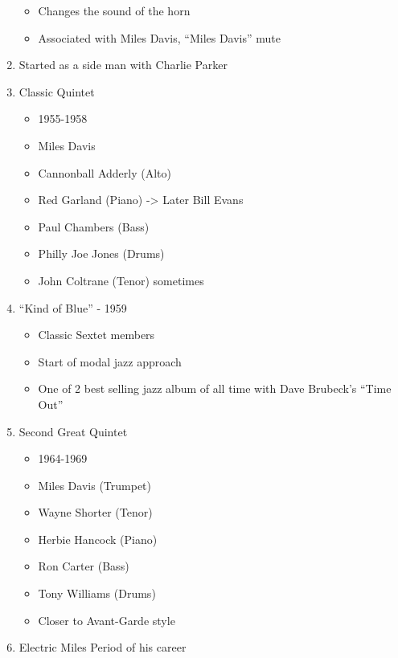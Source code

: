\documentclass[]{article}
\providecommand{\tightlist}{%
  \setlength{\itemsep}{0pt}\setlength{\parskip}{0pt}}
\begin{document}
\begin{enumerate}
  \begin{itemize}
  \tightlist
  \item
    Changes the sound of the horn
  \item
    Associated with Miles Davis, ``Miles Davis'' mute
  \end{itemize}
\item
  Started as a side man with Charlie Parker
\item
  Classic Quintet

  \begin{itemize}
  \tightlist
  \item
    1955-1958
  \item
    Miles Davis
  \item
    Cannonball Adderly (Alto)
  \item
    Red Garland (Piano) -\textgreater{} Later Bill Evans
  \item
    Paul Chambers (Bass)
  \item
    Philly Joe Jones (Drums)
  \item
    John Coltrane (Tenor) sometimes
  \end{itemize}
\item
  ``Kind of Blue'' - 1959

  \begin{itemize}
  \tightlist
  \item
    Classic Sextet members
  \item
    Start of modal jazz approach
  \item
    One of 2 best selling jazz album of all time with Dave Brubeck's
    ``Time Out''
  \end{itemize}
\item
  Second Great Quintet

  \begin{itemize}
  \tightlist
  \item
    1964-1969
  \item
    Miles Davis (Trumpet)
  \item
    Wayne Shorter (Tenor)
  \item
    Herbie Hancock (Piano)
  \item
    Ron Carter (Bass)
  \item
    Tony Williams (Drums)
  \item
    Closer to Avant-Garde style
  \end{itemize}
\item
  Electric Miles Period of his career


\end{enumerate}
\end{document}
